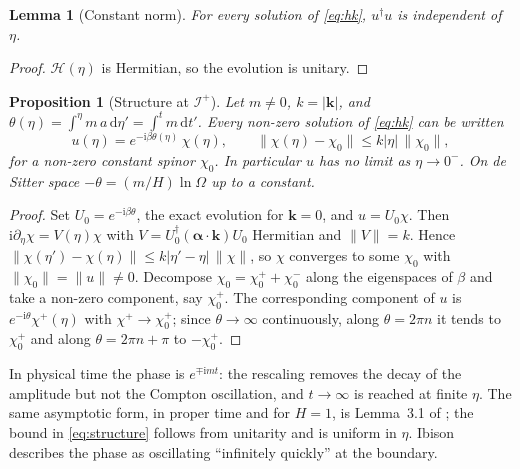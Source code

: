 \documentclass[11pt,a4paper]{article}
\newtheorem{proposition}{Proposition}
\newtheorem{lemma}{Lemma}
\theoremstyle{definition}
\newcommand{\scri}{\mathscr{I}^{+}}
\newcommand{\dd}{\mathrm{d}}
\newcommand{\ii}{\mathrm{i}}
\begin{document}
\begin{lemma}[Constant norm]
\label{lem:norm}
For every solution of \eqref{eq:hk}, $u^{\dagger}u$ is independent of $\eta$.
\end{lemma}
\begin{proof}
$\mathcal{H}(\eta)$ is Hermitian, so the evolution is unitary.
\end{proof}

\begin{proposition}[Structure at $\scri$]
\label{prop:dirac}
Let $m\neq0$, $k=|\mathbf{k}|$, and $\theta(\eta)=\int^{\eta}m\,a\,\dd\eta'=\int^{t}m\,\dd t'$. Every non-zero solution of \eqref{eq:hk} can be written
\begin{equation}
u(\eta)=e^{-\ii\beta\theta(\eta)}\,\chi(\eta),\qquad \|\chi(\eta)-\chi_{0}\|\le k|\eta|\,\|\chi_{0}\|,
\label{eq:structure}
\end{equation}
for a non-zero constant spinor $\chi_{0}$. In particular $u$ has no limit as $\eta\to0^{-}$. On de Sitter space $-\theta=(m/H)\ln\Omega$ up to a constant.
\end{proposition}
\begin{proof}
Set $U_{0}=e^{-\ii\beta\theta}$, the exact evolution for $\mathbf{k}=0$, and $u=U_{0}\chi$. Then $\ii\partial_{\eta}\chi=V(\eta)\chi$ with $V=U_{0}^{\dagger}(\boldsymbol\alpha\cdot\mathbf{k})U_{0}$ Hermitian and $\|V\|=k$. Hence $\|\chi(\eta')-\chi(\eta)\|\le k|\eta'-\eta|\,\|\chi\|$, so $\chi$ converges to some $\chi_{0}$ with $\|\chi_{0}\|=\|u\|\neq0$. Decompose $\chi_{0}=\chi_{0}^{+}+\chi_{0}^{-}$ along the eigenspaces of $\beta$ and take a non-zero component, say $\chi_{0}^{+}$. The corresponding component of $u$ is $e^{-\ii\theta}\chi^{+}(\eta)$ with $\chi^{+}\to\chi_{0}^{+}$; since $\theta\to\infty$ continuously, along $\theta=2\pi n$ it tends to $\chi_{0}^{+}$ and along $\theta=2\pi n+\pi$ to $-\chi_{0}^{+}$.
\end{proof}

In physical time the phase is $e^{\mp\ii mt}$: the rescaling removes the decay of the amplitude but not the Compton oscillation, and $t\to\infty$ is reached at finite $\eta$. The same asymptotic form, in proper time and for $H=1$, is Lemma~3.1 of \cite{DFMR2019}; the bound in \eqref{eq:structure} follows from unitarity and is uniform in $\eta$. Ibison \cite{Ibison2011} describes the phase as oscillating ``infinitely quickly'' at the boundary.
\end{document}
